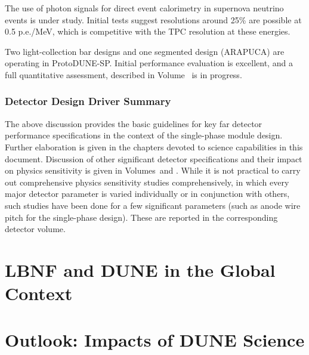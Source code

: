 The use of photon signals for direct event calorimetry in 
supernova neutrino events is under study. Initial tests suggest 
resolutions around 25\% are possible at 0.5 p.e./MeV, which is
competitive with the TPC resolution at these energies.

Two light-collection bar designs and one segmented design 
(ARAPUCA) are operating in ProtoDUNE-SP.  Initial performance 
evaluation is excellent, and a full quantitative assessment, 
described in Volume~\volnumbersp
is in progress.

\subsubsection{Detector Design Driver Summary}

The above discussion provides the basic guidelines for key far 
detector performance specifications in the context of the 
single-phase module design.  Further elaboration is given in the 
chapters devoted to science capabilities in this document.  
Discussion of other significant detector specifications 
and their impact on 
physics sensitivity is given in Volumes~\volnumbersp and 
\volnumberdp.  While it is not practical to carry out 
comprehensive physics sensitivity studies comprehensively, in 
which every major detector parameter is varied individually or 
in conjunction with others, such studies have been done 
for a few significant parameters (such as anode wire pitch for 
the single-phase \lartpc design).  These are reported in the 
corresponding detector volume.


\section{LBNF and DUNE in the Global Context}
\label{sec:exec-glob-context}


\section{Outlook: Impacts of DUNE Science}
\label{sec:exec-impacts}



